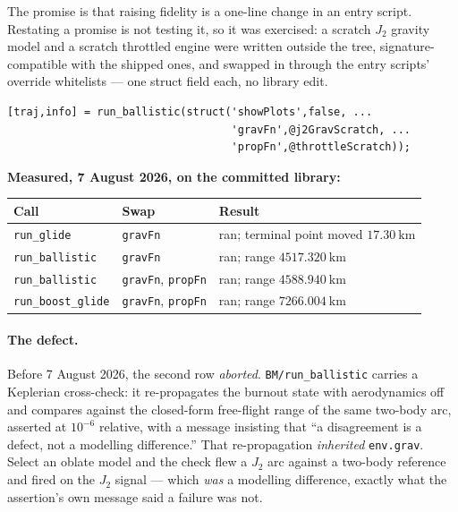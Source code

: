 \documentclass[11pt]{article}
\newcommand{\code}[1]{\texttt{#1}}
\begin{document}
The promise is that raising fidelity is a one-line change in an entry script.
Restating a promise is not testing it, so it was exercised: a scratch $J_2$
gravity model and a scratch throttled engine were written outside the tree,
signature-compatible with the shipped ones, and swapped in through the entry
scripts' override whitelists --- one struct field each, no library edit.

\begin{lstlisting}
[traj,info] = run_ballistic(struct('showPlots',false, ...
                                   'gravFn',@j2GravScratch, ...
                                   'propFn',@throttleScratch));
\end{lstlisting}

\textbf{Measured, 7 August 2026, on the committed library:}

\begin{center}
\begin{tabular}{lll}
\toprule
Call & Swap & Result \\
\midrule
\code{run\_glide}        & \code{gravFn}             & ran; terminal point moved $17.30~\mathrm{km}$ \\
\code{run\_ballistic}    & \code{gravFn}             & ran; range $4517.320~\mathrm{km}$ \\
\code{run\_ballistic}    & \code{gravFn}, \code{propFn} & ran; range $4588.940~\mathrm{km}$ \\
\code{run\_boost\_glide} & \code{gravFn}, \code{propFn} & ran; range $7266.004~\mathrm{km}$ \\
\bottomrule
\end{tabular}
\end{center}

\paragraph{The defect.} Before 7 August 2026, the second row \emph{aborted}.
\code{BM/run\_ballistic} carries a Keplerian cross-check: it re-propagates the
burnout state with aerodynamics off and compares against the closed-form
free-flight range of the same two-body arc, asserted at $10^{-6}$ relative,
with a message insisting that ``a disagreement is a defect, not a modelling
difference.'' That re-propagation \emph{inherited} \code{env.grav}. Select an
oblate model and the check flew a $J_2$ arc against a two-body reference and
fired on the $J_2$ signal --- which \emph{was} a modelling difference, exactly
what the assertion's own message said a failure was not.
\end{document}

